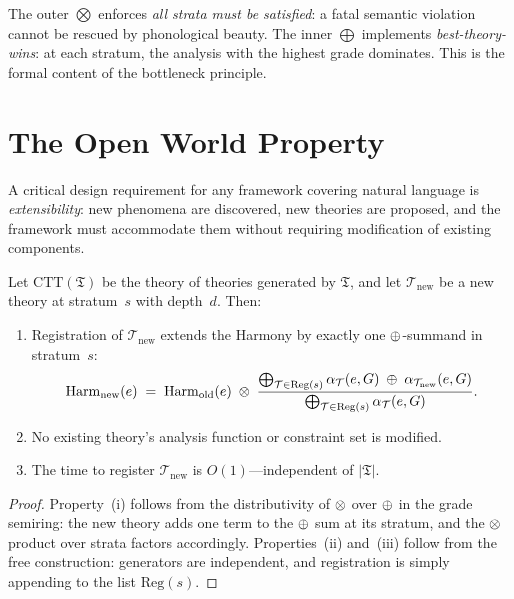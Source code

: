 \begin{remark}
The outer $\bigotimes$ enforces \emph{all strata must be satisfied}:
a fatal semantic violation cannot be rescued by phonological beauty.
The inner $\bigoplus$ implements \emph{best-theory-wins}: at each
stratum, the analysis with the highest grade dominates.
This is the formal content of the bottleneck principle.
\end{remark}

\section{The Open World Property}
\label{sec:open-world}

A critical design requirement for any framework covering natural
language is \emph{extensibility}: new phenomena are discovered, new
theories are proposed, and the framework must accommodate them
without requiring modification of existing components.

\begin{theorem}
\label{thm:open-world}
Let $\mathrm{CTT}(\mathfrak{T})$ be the theory of theories
generated by $\mathfrak{T}$, and let $\mathcal{T}_{\mathrm{new}}$ be
a new theory at stratum~$s$ with depth~$d$.  Then:
\begin{enumerate}[label=(\roman*)]
\item Registration of $\mathcal{T}_{\mathrm{new}}$ extends the
  Harmony by exactly one $\oplus$-summand in stratum~$s$:
  \[
    \mathrm{Harm}_{\mathrm{new}}(e)
    \;=\; \mathrm{Harm}_{\mathrm{old}}(e)
    \;\otimes\; \frac{
      \bigoplus_{\mathcal{T} \in \mathrm{Reg}(s)}
      \alpha_{\mathcal{T}}(e,G) \;\oplus\;
      \alpha_{\mathcal{T}_{\mathrm{new}}}(e,G)
    }{
      \bigoplus_{\mathcal{T} \in \mathrm{Reg}(s)}
      \alpha_{\mathcal{T}}(e,G)
    }.
  \]
\item No existing theory's analysis function or constraint set is
  modified.
\item The time to register $\mathcal{T}_{\mathrm{new}}$ is
  $O(1)$---independent of $|\mathfrak{T}|$.
\end{enumerate}
\end{theorem}

\begin{proof}
Property~(i) follows from the distributivity of $\otimes$ over $\oplus$
in the grade semiring: the new theory adds one term to the $\oplus$
sum at its stratum, and the $\otimes$ product over strata factors
accordingly.  Properties~(ii) and~(iii) follow from the free
construction: generators are independent, and registration is simply
appending to the list $\mathrm{Reg}(s)$.
\end{proof}

